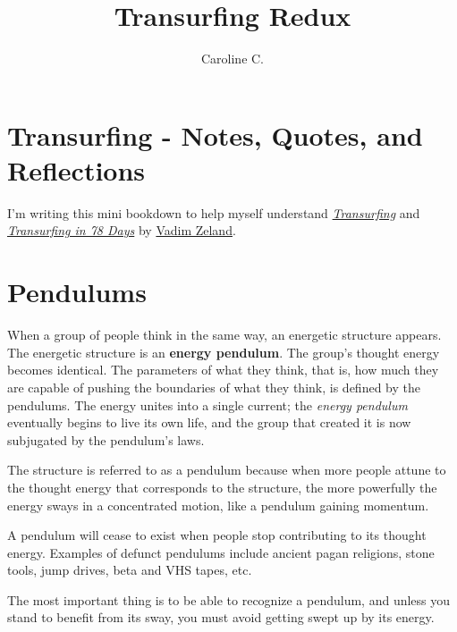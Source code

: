 \documentclass[
  openany]{book}
\title{Transurfing Redux}
\author{Caroline C.}
\date{}
\begin{document}
\maketitle

{
\setcounter{tocdepth}{1}
\tableofcontents
}
\hypertarget{transurfing---notes-quotes-and-reflections}{%
\chapter{Transurfing - Notes, Quotes, and Reflections}\label{transurfing---notes-quotes-and-reflections}}

I'm writing this mini bookdown to help myself understand \href{https://www.amazon.com/Reality-transurfing-Steps-Vadim-Zeland/dp/1532814658}{\emph{Transurfing}} and \href{https://www.amazon.com/Transurfing-78-Days-Practical-Creating/dp/5957334715/ref=pd_lpo_1?pd_rd_i=5957334715\&psc=1}{\emph{Transurfing in 78 Days}} by \href{https://www.amazon.com/Vadim-Zeland/e/B00J0SESMY/ref=dp_byline_cont_pop_book_1}{Vadim Zeland}.

\hypertarget{pendulums}{%
\chapter{Pendulums}\label{pendulums}}

When a group of people think in the same way, an energetic structure appears. The energetic structure is an \textbf{energy pendulum}. The group's thought energy becomes identical. The parameters of what they think, that is, how much they are capable of pushing the boundaries of what they think, is defined by the pendulums. The energy unites into a single current; the \emph{energy pendulum} eventually begins to live its own life, and the group that created it is now subjugated by the pendulum's laws.

The structure is referred to as a pendulum because when more people attune to the thought energy that corresponds to the structure, the more powerfully the energy sways in a concentrated motion, like a pendulum gaining momentum.

A pendulum will cease to exist when people stop contributing to its thought energy. Examples of defunct pendulums include ancient pagan religions, stone tools, jump drives, beta and VHS tapes, etc.

The most important thing is to be able to recognize a pendulum, and unless you stand to benefit from its sway, you must avoid getting swept up by its energy.
\end{document}
